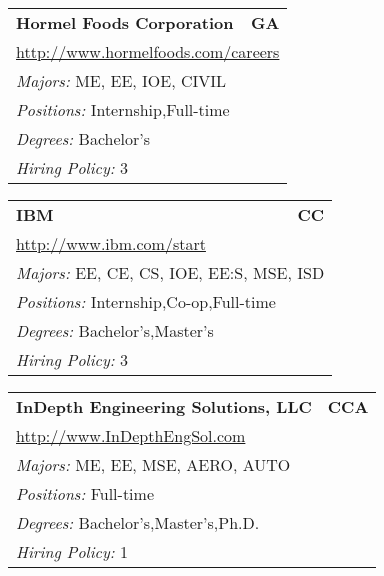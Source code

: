\documentclass[twoside]{article}
\begin{document}
\begin{center}
\begin{multicols}{3}
\begin{FlushLeft}
\begin{minipage}{\columnwidth}
\end{minipage}
 
\begin{minipage}{\columnwidth}\begin{tabularx}{.95\columnwidth}{Xr}
                 {\Large\bf Hormel Foods Corporation} & {\Large\bf GA}\\
    \multicolumn{2}{p{.95\columnwidth}}{\url{http://www.hormelfoods.com/careers}}\\
    \multicolumn{2}{p{.95\columnwidth}}{\emph{Majors:} ME, EE, IOE, CIVIL}\\
    \multicolumn{2}{p{.95\columnwidth}}{\emph{Positions:} Internship,Full-time}\\
    \multicolumn{2}{p{.95\columnwidth}}{\emph{Degrees:} Bachelor's}\\
    \multicolumn{2}{p{.95\columnwidth}}{\emph{Hiring Policy:} 3}\\
    \end{tabularx}
    
\end{minipage}
 
\begin{minipage}{\columnwidth}\begin{tabularx}{.95\columnwidth}{Xr}
                 {\Large\bf IBM} & {\Large\bf CC}\\
    \multicolumn{2}{p{.95\columnwidth}}{\url{http://www.ibm.com/start}}\\
    \multicolumn{2}{p{.95\columnwidth}}{\emph{Majors:} EE, CE, CS, IOE, EE:S, MSE, ISD}\\
    \multicolumn{2}{p{.95\columnwidth}}{\emph{Positions:} Internship,Co-op,Full-time}\\
    \multicolumn{2}{p{.95\columnwidth}}{\emph{Degrees:} Bachelor's,Master's}\\
    \multicolumn{2}{p{.95\columnwidth}}{\emph{Hiring Policy:} 3}\\
    \end{tabularx}
    
\end{minipage}
 
\begin{minipage}{\columnwidth}\begin{tabularx}{.95\columnwidth}{Xr}
                 {\Large\bf InDepth Engineering Solutions, LLC} & {\Large\bf CCA}\\
    \multicolumn{2}{p{.95\columnwidth}}{\url{http://www.InDepthEngSol.com}}\\
    \multicolumn{2}{p{.95\columnwidth}}{\emph{Majors:} ME, EE, MSE, AERO, AUTO}\\
    \multicolumn{2}{p{.95\columnwidth}}{\emph{Positions:} Full-time}\\
    \multicolumn{2}{p{.95\columnwidth}}{\emph{Degrees:} Bachelor's,Master's,Ph.D.}\\
    \multicolumn{2}{p{.95\columnwidth}}{\emph{Hiring Policy:} 1}\\
    \end{tabularx}
    

\end{minipage}
\end{FlushLeft}
\end{multicols}
\end{center}
\end{document}
